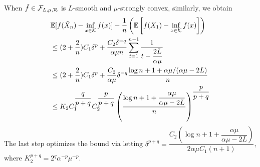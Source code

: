  When $\tilde{f}\in \mathcal{F}_{L,\mu, \mathcal{R}}$ is $L$-smooth and $\mu$-strongly convex, similarly, we obtain
 \begin{align*}
& \mathbb{E}[f(\hat X_n) - \inf_{x \in \mathcal{K}} f(x)] -\dfrac{1}{n}\left(\mathbb{E}\left[f(X_1)-\inf_{x \in \mathcal{K}}f(x)\right]\right)\\
&\le (2+\dfrac{2}{n})C_1\delta^p+\dfrac{C_2 \delta^{-q}}{\alpha \mu n} \sum_{t=1}^{n-1}\dfrac{1}{t-\dfrac{2L}{\alpha \mu}}\\
&\le (2+\dfrac{2}{n})C_1\delta^p+\dfrac{C_2 }{\alpha \mu}\delta^{-q} \dfrac{\log n+1+\alpha \mu/(\alpha \mu-2L)}{n}\\
&\le K_2C_1^{\dfrac{q}{p+q}}C_2^{\dfrac{p}{p+q}} \left( \dfrac{\log n+1+\dfrac{\alpha \mu}{\alpha \mu -2L}}{n} \right)^{\dfrac{p}{p+q}}
 \end{align*}
The last step optimizes the bound via letting 
$\delta^{p+q} =  \dfrac{C_2\left( \log n+1+\dfrac{\alpha \mu}{\alpha \mu -2L}\right)}{2\alpha \mu C_1 (n+1)}$, 
where
$K_2^{p+q}=2^{q}\alpha^{-p}\mu^{-p}$.
